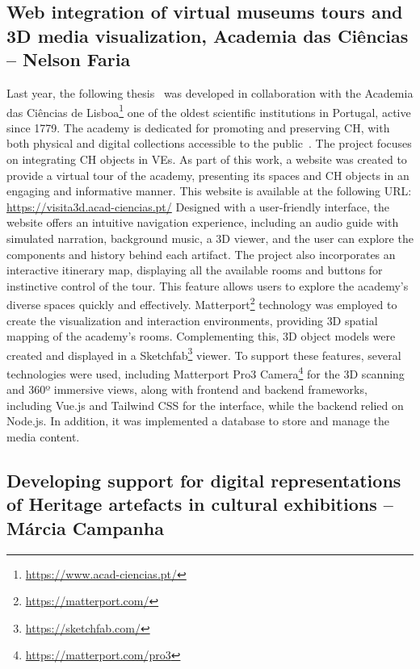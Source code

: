 \subsection{Web integration of virtual museums tours and \gls{3D} media visualization, Academia das Ciências – Nelson Faria}
\label{sec:thesis3_nova}

Last year, the following thesis~\cite{tese_tourFaria2024} was developed in collaboration with the Academia das Ciências de Lisboa\footnote{\url{https://www.acad-ciencias.pt/}} one of the oldest scientific institutions in Portugal, active since 1779.
The academy is dedicated for promoting and preserving \gls{CH}, with both physical and digital collections accessible to the public~\cite{academiaCiencias2024}.
The project focuses on integrating \gls{CH} objects in \glspl{VE}. As part of this work, a website was created to provide a virtual tour of the academy, presenting its spaces and \gls{CH} objects in an engaging and informative manner.
This website is available at the following URL: \url{https://visita3d.acad-ciencias.pt/} 
Designed with a user-friendly interface, the website offers an intuitive navigation experience, including an audio guide with simulated narration, background music, a \gls{3D} viewer, and the user can explore the components and history behind each artifact.
The project also incorporates an interactive itinerary map, displaying all the available rooms and buttons for instinctive control of the tour. This feature allows users to explore the academy's diverse spaces quickly and effectively.
Matterport\footnote{\url{https://matterport.com/}} technology was employed to create the visualization and interaction environments, providing \gls{3D} spatial mapping of the academy's rooms. Complementing this, \gls{3D} object models were created and displayed in a Sketchfab\footnote{\url{https://sketchfab.com/}} viewer. 
To support these features, several technologies were used, including Matterport Pro3 Camera\footnote{\url{https://matterport.com/pro3}} for the \gls{3D} scanning and 360º immersive views, along with frontend and backend frameworks, including Vue.js and Tailwind CSS for the interface, 
while the backend relied on Node.js. In addition, it was implemented a database to store and manage the media content.

\subsection{Developing support for digital representations of Heritage artefacts in cultural exhibitions – Márcia Campanha}
\label{sec:marcia_thesis}

